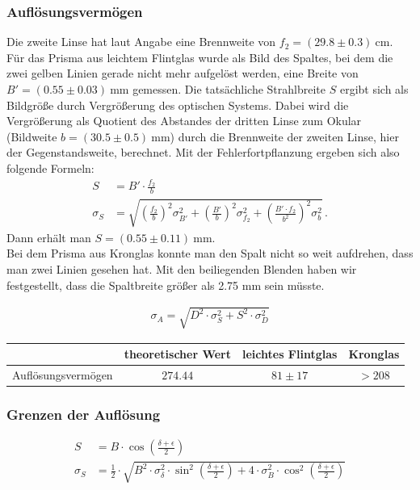 \documentclass[12pt,a4paper,titlepage,headinclude,bibtotoc]{scrartcl}
\begin{document}
\subsubsection{Auflösungsvermögen}
Die zweite Linse hat laut Angabe eine Brennweite von $f_2=(29.8 \pm 0.3)~$cm.
Für das Prisma aus leichtem Flintglas wurde als Bild des Spaltes, bei dem die zwei gelben Linien gerade nicht mehr aufgelöst werden, eine Breite von $B'=(0.55 \pm 0.03)~$mm gemessen.
Die tatsächliche Strahlbreite $S$ ergibt sich als Bildgröße durch Vergrößerung des optischen Systems.
Dabei wird die Vergrößerung als Quotient des Abstandes der dritten Linse zum Okular (Bildweite $b=(30.5\pm 0.5)~$mm) durch die Brennweite der zweiten Linse, hier der Gegenstandsweite, berechnet.
Mit der Fehlerfortpflanzung ergeben sich also folgende Formeln:
\begin{align}
	S&=B'\cdot\frac{f_2}{b}\\
	\sigma_S&=\sqrt{\left(\frac{f_2}{b}\right)^2\sigma_{B'}^2+\left(\frac{B'}{b}\right)^2\sigma_{f_2}^2+\left(\frac{B' \cdot f_2}{b^2}\right)^2\sigma_b^2}\,.
\end{align}
Dann erhält man $S=(0.55\pm 0.11)~$mm.\\
Bei dem Prisma aus Kronglas konnte man den Spalt nicht so weit aufdrehen, dass man zwei Linien gesehen hat.
Mit den beiliegenden Blenden haben wir festgestellt, dass die Spaltbreite größer als 2.75 mm sein müsste.

\begin{align}
\sigma_{A}=\sqrt{D^{2} \cdot \sigma_{S}^{2} + S^{2} \cdot \sigma_{D}^{2}}
\end{align}

\begin{table}[!htb]
	\centering
	\begin{tabular}{|c|c|c|c|}
		\hline		
		& theoretischer Wert & leichtes Flintglas &  Kronglas \\
		\hline
	    Auflösungsvermögen & $274.44$ & $81 \pm 17$ & $>208$ \\
		\hline		
	\end{tabular}
\end{table}

\subsubsection{Grenzen der Auflösung}

\begin{align}
	S&=B \cdot \cos{\left (\frac{\delta+\epsilon}{2}\right )}\\
\sigma_{S}&=\frac{1}{2} \cdot \sqrt{B^{2} \cdot \sigma_{\delta}^{2} \cdot \sin^{2}{\left (\frac{\delta+\epsilon}{2} \right )} + 4 \cdot \sigma_{B}^{2} \cdot \cos^{2}{\left (\frac{\delta+\epsilon}{2} \right )}}
\end{align}
\end{document}
